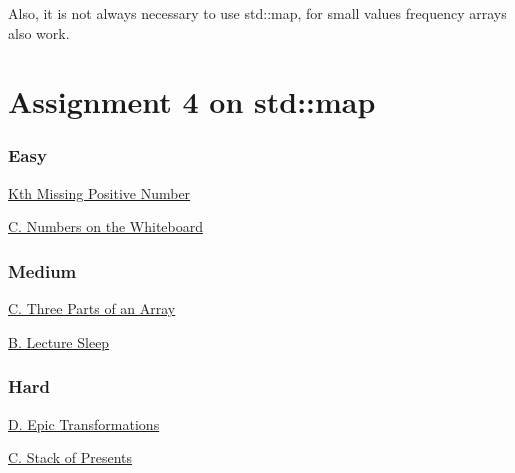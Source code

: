 \documentclass[13pt,oneside,a4paper]{book}
\begin{document}
Also, it is not always necessary to use std::map, for small values frequency arrays also work.

\chapter{Assignment 4 on std::map}

\subsection{Easy}

\href{https://leetcode.com/problems/kth-missing-positive-number/}{Kth Missing Positive Number}

\smallskip

\href{https://codeforces.com/problemset/problem/1430/C}{C. Numbers on the Whiteboard}

\subsection{Medium}

\href{https://codeforces.com/problemset/problem/1006/C}{C. Three Parts of an Array}

\smallskip

\href{https://codeforces.com/problemset/problem/961/B}{B. Lecture Sleep}

\subsection{Hard}

\href{https://codeforces.com/contest/1506/problem/D}{D. Epic Transformations}

\smallskip

\href{https://codeforces.com/problemset/problem/1279/C}{C. Stack of Presents}
\end{document}
